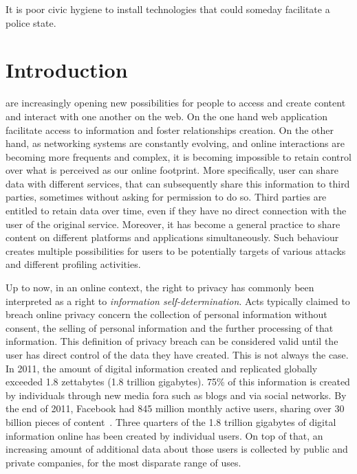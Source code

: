 \begin{savequote}[75mm] 
It is poor civic hygiene to install technologies that could someday facilitate a police state.
\end{savequote}

\chapter{Introduction}

 are increasingly opening new possibilities for people to access and create content and interact with one another on the web. On the one hand web application facilitate access to information and foster relationships creation. On the other hand, as networking systems are constantly evolving, and online interactions are becoming more frequents and complex, it is becoming impossible to retain control over what is perceived as our online footprint. More specifically, user can share data with different services, that can subsequently share this information to third parties, sometimes without asking for permission to do so. Third parties are entitled to retain data over time, even if they have no direct connection with the user of the original service. Moreover, it has become a general practice to share content on different platforms and applications simultaneously. Such behaviour creates multiple possibilities for users to be potentially targets of various attacks and different profiling activities.

Up to now, in an online context, the right to privacy has commonly been interpreted as a right to \emph{information self-determination}. Acts typically claimed to breach online privacy concern the collection of personal information without consent, the selling of personal information and the further processing of that information. This definition of privacy breach can be considered valid until the user has direct control of the data they have created. This is not always the case. In 2011, the amount of digital information created and replicated globally exceeded 1.8 zettabytes (1.8 trillion gigabytes). 75\% of this information is created by individuals through new media fora such as blogs and via social networks. By the end of 2011, Facebook had 845 million monthly active users, sharing over 30 billion pieces of content~\cite{library-briefing}. Three quarters of the 1.8 trillion gigabytes of digital information online has been created by individual users. On top of that, an increasing amount of additional data about those users is collected by public and private companies, for the most disparate range of uses.

